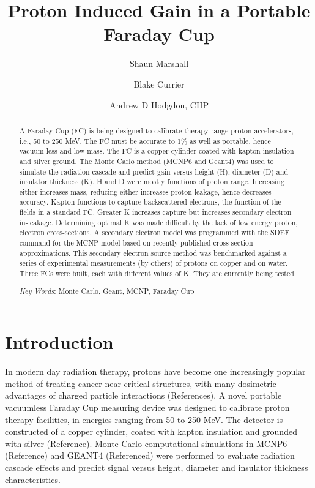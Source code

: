 \documentclass{mc2015}
\begin{document}
\title{Proton Induced Gain in a Portable Faraday Cup}

\author{Shaun Marshall}
\author{Blake Currier}

\author{Andrew D Hodgdon, CHP}

\maketitle

\begin{abstract}
A Faraday Cup (FC) is being designed to calibrate therapy-range proton accelerators, i.e., 50 to 250 MeV. The FC must be accurate to 1\% as well as portable, hence vacuum-less and low mass. The FC is a copper cylinder coated with kapton insulation and silver ground. The Monte Carlo method (MCNP6 and Geant4) was used to simulate the radiation cascade and predict gain versus height (H), diameter (D) and insulator thickness (K). H and D were mostly functions of proton range. Increasing either increases mass, reducing either increases proton leakage, hence decreases accuracy. Kapton functions to capture backscattered electrons, the function of the fields in a standard FC. Greater K increases capture but increases secondary electron in-leakage. Determining optimal K was made difficult by the lack of low energy proton, electron cross-sections. A secondary electron model was programmed with the SDEF command for the MCNP model based on recently published cross-section approximations. This secondary electron source method was benchmarked against a series of experimental measurements (by others) of protons on copper and on water. Three FCs were built, each with different values of K. They are currently being tested. 

\emph{Key Words}: Monte Carlo, Geant, MCNP, Faraday Cup
\end{abstract}


\section{Introduction}

In modern day radiation therapy, protons have become one increasingly popular method of treating cancer near critical structures, with many dosimetric advantages of charged particle interactions (References). A novel portable vacuumless Faraday Cup measuring device was designed to calibrate proton therapy facilities, in energies ranging from 50 to 250 MeV. The detector is constructed of a copper cylinder, coated with kapton insulation and grounded with silver (Reference). Monte Carlo computational simulations in MCNP6 (Reference) and GEANT4 (Referenced) were performed to evaluate radiation cascade effects and predict signal versus height, diameter and insulator thickness characteristics.
\end{document}
